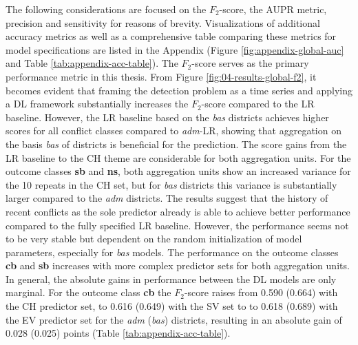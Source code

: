 \documentclass[a4paper,11pt]{article}
\begin{document}
The following considerations are focused on the \(F_2\)-score, the AUPR
metric, precision and sensitivity for reasons of brevity. Visualizations of
additional accuracy metrics as well as a comprehensive
table comparing these metrics for model specifications are listed in the
Appendix (Figure \ref{fig:appendix-global-auc} and Table \ref{tab:appendix-acc-table}).
The \(F_2\)-score serves as the primary performance metric in this thesis.
From Figure \ref{fig:04-results-global-f2}, it becomes evident that framing the
detection problem as a time series and applying a DL framework substantially
increases the \(F_2\)-score compared to the LR baseline. However, the LR baseline
based on the \emph{bas} districts achieves higher scores for all conflict classes
compared to \emph{adm}-LR, showing that aggregation on the basis \emph{bas} of districts
is beneficial for the prediction. The score gains from the LR baseline
to the CH theme are considerable for both aggregation units. For the outcome classes
\textbf{sb} and \textbf{ns}, both aggregation units show an increased variance
for the 10 repeats in the CH set, but for \emph{bas} districts this variance is substantially
larger compared to the \emph{adm} districts. The results suggest that the history of
recent conflicts as the sole predictor already is able to achieve better performance
compared to the fully specified LR baseline. However, the performance seems not
to be very stable but dependent on the random initialization of model parameters,
especially for \emph{bas} models. The performance on the outcome classes \textbf{cb} and \textbf{sb}
increases with more complex predictor sets for both aggregation units. In general,
the absolute gains in performance between the DL models are only marginal. For
the outcome class \textbf{cb} the \(F_2\)-score raises from 0.590 (0.664)
with the CH predictor set, to 0.616 (0.649) with the SV set to to 0.618 (0.689)
with the EV predictor set for the \emph{adm} (\emph{bas}) districts, resulting in an absolute
gain of 0.028 (0.025) points (Table \ref{tab:appendix-acc-table}).
\end{document}
